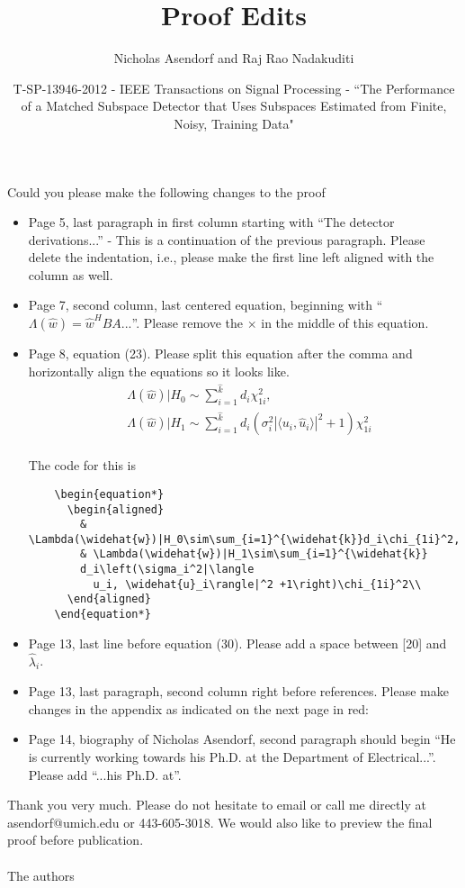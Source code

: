 \documentclass[11pt]{article}
\title{Proof Edits}
\author{Nicholas Asendorf and Raj Rao Nadakuditi}
\date{T-SP-13946-2012 - IEEE Transactions on Signal Processing - ``The Performance of a Matched Subspace Detector that Uses Subspaces Estimated from Finite, Noisy, Training Data"}
\begin{document}
\maketitle


Could you please make the following changes to the proof
\begin{itemize}
  \item Page 5, last paragraph in first column starting with ``The detector
    derivations...'' - This is a continuation of the previous paragraph. Please delete the
    indentation, i.e., please make the first line left aligned with the column as well.
  \item Page 7, second column, last centered equation, beginning with
    ``$\Lambda(\widehat{w})=\widehat{w}^H BA...$''. Please remove the $\times$ in the middle of this equation.
  \item Page 8, equation (23). Please split this equation after the comma and
    horizontally align the equations so it looks like.
    \begin{equation*}
      \begin{aligned}
        & \Lambda(\widehat{w})|H_0\sim\sum_{i=1}^{\widehat{k}}d_i\chi_{1i}^2,\\
        & \Lambda(\widehat{w})|H_1\sim\sum_{i=1}^{\widehat{k}}
        d_i\left(\sigma_i^2|\langle
          u_i, \widehat{u}_i\rangle|^2 +1\right)\chi_{1i}^2\\
      \end{aligned}
    \end{equation*}

    The code for this is
    \small
\begin{verbatim}
    \begin{equation*}
      \begin{aligned}
        & \Lambda(\widehat{w})|H_0\sim\sum_{i=1}^{\widehat{k}}d_i\chi_{1i}^2,\\
        & \Lambda(\widehat{w})|H_1\sim\sum_{i=1}^{\widehat{k}}
        d_i\left(\sigma_i^2|\langle
          u_i, \widehat{u}_i\rangle|^2 +1\right)\chi_{1i}^2\\
      \end{aligned}
    \end{equation*}
\end{verbatim}

    \normalsize

  \item Page 13, last line before equation (30). Please add a space between [20] and
    $\widehat{\lambda}_i$.
  \item Page 13, last paragraph, second column right before references. Please make
    changes in the appendix as indicated on the next page in red:
  \item Page 14, biography of Nicholas Asendorf, second paragraph should begin ``He is
    currently working towards his Ph.D. at the Department of Electrical...''. Please add
    ``...his Ph.D. at''.
\end{itemize}

\newpage 
Thank you very much. Please do not hesitate to email or call me directly at
asendorf@umich.edu or 443-605-3018. We would also like to preview the final proof before publication.\\



\\

The authors
\end{document}
